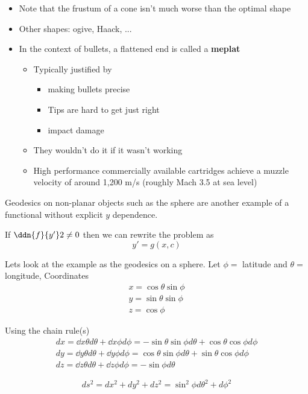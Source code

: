 \documentclass{E:/Documents/Latex/myassignment}
\begin{document}
\begin{itemize}
	\item Note that the frustum of a cone isn't much worse than the optimal shape
	\item Other shapes: ogive, Haack, ...
	\item In the context of bullets, a flattened end is called a \textbf{meplat}
	\begin{itemize}
		\item Typically justified by
		\begin{itemize}
			\item making bullets precise
			\item Tips are hard to get just right
			\item impact damage
		\end{itemize}
		\item They wouldn't do it if it wasn't working
		\item High performance commercially available cartridges achieve a muzzle velocity of around 1,200 m/s (roughly Mach 3.5 at sea level)
	\end{itemize}
\end{itemize}


Geodesics on non-planar objects such as the sphere are another example of a functional without explicit $y$ dependence.

If $\ddn{f}{y'}2 \neq 0$ then we can rewrite the problem as
\[y' = g(x,c)\]



Lets look at the example as the geodesics on a sphere. Let $\phi = $ latitude and $\theta = $ longitude,
Coordinates
\begin{align*}
	x = \cos\theta \sin\phi\\
	y = \sin\theta \sin \phi \\
	z = \cos\phi
\end{align*}

Using the chain rule(s)
\begin{align*}
	dx = \dd x \theta d\theta + \dd x \phi d\phi = -\sin\theta \sin\phi d\theta + \cos\theta \cos \phi d\phi\\
	dy = \dd y \theta d\theta + \dd y \phi d\phi =\cos\theta \sin\phi d\theta + \sin\theta \cos\phi d\phi\\
	dz = \dd z\theta d\theta + \dd z\phi d\phi = -\sin\phi d\theta
\end{align*}

\[ds^2 = dx^2 + dy^2 + dz^2 = \sin^2\phi d\theta^2 + d\phi^2\]
\end{document}
